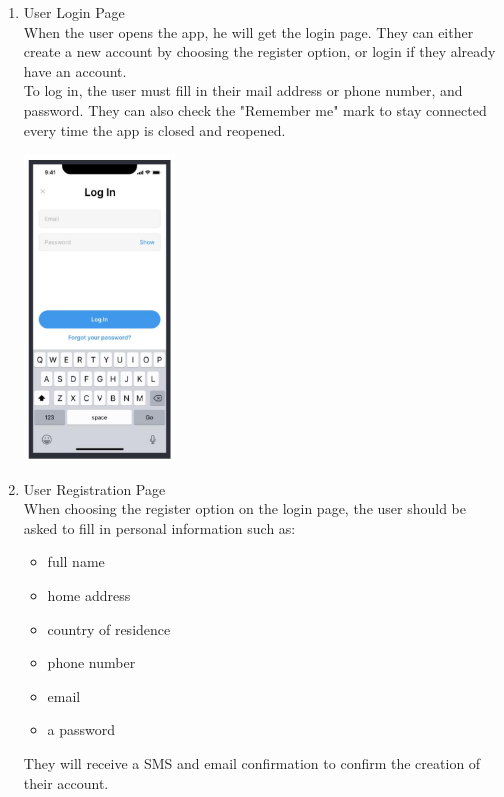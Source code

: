 \documentclass[10pt]{article}
\begin{document}
\begin{multicols*}{2}
\begin{enumerate}
  \item {User Login Page} \\
  When the user opens the app, he will get the login page. They can either create a new account by choosing the register option, or login if they already have an account. \\
  To log in, the user must fill in their mail address or phone number, and password. They can also check the "Remember me" mark to stay connected every time the app is closed and reopened. \\
  \begin{center}
    \includegraphics[max width=4cm]{login.jpg}
  \end{center}

  \item {User Registration Page} \\
  When choosing the register option on the login page, the user should be asked to fill in personal information such as:
  \begin{itemize}
    \item full name
    \item home address
    \item country of residence
    \item phone number
    \item email
    \item a password
  \end{itemize}
  They will receive a SMS and email confirmation to confirm the creation of their account.
  

\end{enumerate}
\end{multicols*}
\end{document}
